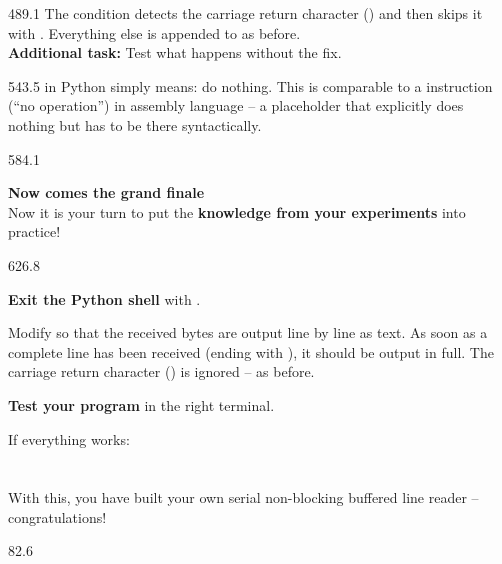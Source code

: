 \documentclass{aslab}
\begin{document}
\begin{region}[x=74.7,right=0,pitch=13.5]{489.1}
The  condition detects the carriage return character
() and then skips it with . Everything else is
appended to  as before.\\
\textbf{Additional task:} Test what happens without the  fix.
\end{region}

\begin{region}[x=74.7,right=0,pitch=13.25]{543.5}
 in Python simply means: do nothing. This is comparable to a
 instruction (``no operation'') in assembly language -- a
placeholder that explicitly does nothing but has to be there syntactically.
\end{region}

\begin{region}[pitch=14.2]{584.1}
\begin{tasks}[start=9]
\item \textbf{Now comes the grand finale}\\
  Now it is your turn to put the \textbf{knowledge from your experiments}
  into practice!
\end{tasks}
\end{region}

\begin{region}[x=74.7,right=0,pitch=13.4]{626.8}
\begin{dotlist}
\item \textbf{Exit the Python shell} with .
\item Modify  so that the received bytes are output
  line by line as text. As soon as a complete line has been received (ending
  with \code{\n}), it should be output in full. The carriage return
  character (\code{\r}) is ignored -- as before.
\item \textbf{Test your program} in the right terminal.
\item If everything works:\\
  \\
  \\
  With this, you have built your own serial non-blocking buffered line
  reader -- congratulations!
\end{dotlist}
\end{region}

\nextpage
\begin{region}{82.6}
\end{region}
\end{document}
